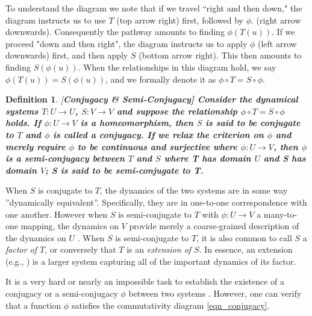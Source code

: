 \documentclass[a4paper,12pt,twoside]{report}
\newtheorem{Definition}{Definition}[]
\begin{document}
To understand the diagram we note that if we travel ``right and then down," the diagram instructs us to use $T$ (top arrow right) first, followed by $\phi$. (right arrow downwards). Consequently the pathway amounts to finding $\phi(T(u))$. If we proceed "down and then right", the diagram instructs us to apply $\phi$ (left arrow downwards) first, and then apply $S$ (bottom arrow right). This then amounts to finding  $S(\phi(u))$. When the relationships in this diagram hold, we say $\phi(T(u))= S(\phi(u))$, and we formally denote it as $\phi \circ T=S\circ \phi$.

\begin{Definition}\rm  
  [\bf {Conjugacy \& Semi-Conjugacy}]\label{Dfn_Conjugate}\rm
  Consider the dynamical systems $T:U\to{U}$, $S:V\to{V}$ and suppose the relationship $\phi \circ T=S\circ \phi$ holds. If $\phi:U\to{V}$ is a homeomorphism, then $S$ is said to be conjugate to $T$ and $\phi$ is called a conjugacy. If we relax the criterion on $\phi$ and merely require $\phi$ to be continuous and surjective where $\phi:U\to{V}$, then $\phi$ is a semi-conjugacy between $T$ and $S$ where T has domain $U$ and S has domain $V$; S is said to be semi-conjugate to T. 
\end{Definition} 

When $S$ is conjugate to $T$, the dynamics of the two systems are in some way ''dynamically equivalent''. Specifically, they are in one-to-one correspondence with one another. However when $S$ is semi-conjugate to $T$ with $\phi:U\to{V}$ a many-to-one mapping, the dynamics on $V$ provide merely a coarse-grained description of the dynamics on $U$ \cite{de2013elements}. When $S$ is semi-conjugate to $T$, it is also common to call $S$ a \emph{factor of $T$}, or conversely that $T$ is an \emph{extension of $S$}. In essence, an extension (e.g., \cite{de2013elements}) is a larger system capturing all of the important dynamics of its factor.

It is a very hard or nearly an impossible task to establish the existence of a conjugacy or a semi-conjugacy $\phi$ between two systems \cite{devaney2018introduction}. However, one can verify that a function $\phi$ satisfies the commutativity diagram \ref{eqn_conjugacy}.  
\end{document}

